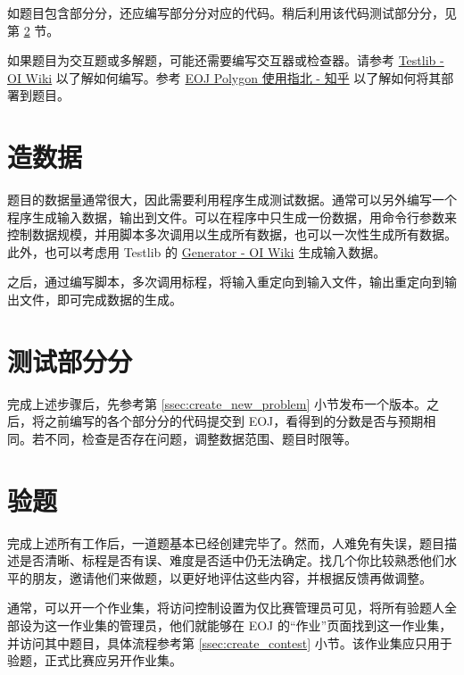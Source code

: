 \documentclass[oneside]{book}
\begin{document}
如题目包含部分分，还应编写部分分对应的代码。稍后利用该代码测试部分分，见第 
\ref{sec:test_partial_score} 节。

如果题目为交互题或多解题，可能还需要编写交互器或检查器。请参考 \href{https://oi-wiki.org/tools/testlib/}{Testlib - OI Wiki} 以了解如何编写。参考 \href{https://zhuanlan.zhihu.com/p/59869879}{EOJ Polygon 使用指北 - 知乎} 以了解如何将其部署到题目。

\section{造数据}

\label{sec:generating_data}

题目的数据量通常很大，因此需要利用程序生成测试数据。通常可以另外编写一个程序生成输入数据，输出到文件。可以在程序中只生成一份数据，用命令行参数来控制数据规模，并用脚本多次调用以生成所有数据，也可以一次性生成所有数据。此外，也可以考虑用 Testlib 的 \href{https://oi-wiki.org/tools/testlib/generator/}{Generator - OI Wiki} 生成输入数据。

之后，通过编写脚本，多次调用标程，将输入重定向到输入文件，输出重定向到输出文件，即可完成数据的生成。

\section{测试部分分}

\label{sec:test_partial_score}

完成上述步骤后，先参考第 \ref{ssec:create_new_problem} 小节发布一个版本。之后，将之前编写的各个部分分的代码提交到 EOJ，看得到的分数是否与预期相同。若不同，检查是否存在问题，调整数据范围、题目时限等。

\section{验题}

\label{sec:verify_problem}

完成上述所有工作后，一道题基本已经创建完毕了。然而，人难免有失误，题目描述是否清晰、标程是否有误、难度是否适中仍无法确定。找几个你比较熟悉他们水平的朋友，邀请他们来做题，以更好地评估这些内容，并根据反馈再做调整。

通常，可以开一个作业集，将访问控制设置为仅比赛管理员可见，将所有验题人全部设为这一作业集的管理员，他们就能够在 EOJ 的``作业''页面找到这一作业集，并访问其中题目，具体流程参考第 \ref{ssec:create_contest} 小节。该作业集应只用于验题，正式比赛应另开作业集。
\end{document}
